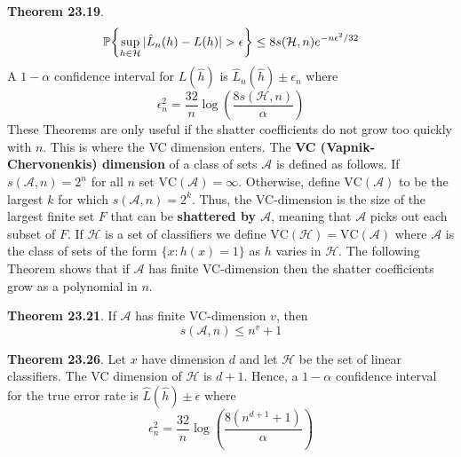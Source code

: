 \textbf{Theorem 23.19}.
\[
\PROB \left\{ \sup_{h \in \mathcal{H}} | \hat{L}_{n}(h) - L(h) | > \epsilon \right\} \leq 8 s(\mathcal{H}, n) e^{-n \epsilon^{2} / 32}
\]
A \(1 - \alpha\) confidence interval for \(L(\hat{h})\) is
\(\hat{L}_{n}(\hat{h}) \pm \epsilon_{n}\) where
\[
\epsilon_{n}^{2} = \frac{32}{n} \log \left( \frac{8 s(\mathcal{H}, n)}{\alpha} \right)
\]
These Theorems are only useful if the shatter coefficients do not grow
too quickly with \(n\). This is where the VC dimension enters.
The \textbf{VC (Vapnik-Chervonenkis) dimension} of a class of sets
\(\mathcal{A}\) is defined as follows. If \(s(\mathcal{A}, n) = 2^{n}\)
for all \(n\) set \(\text{VC}(\mathcal{A}) = \infty\). Otherwise, define
\(\text{VC}(\mathcal{A})\) to be the largest \(k\) for which
\(s(\mathcal{A}, n) = 2^{k}\).
Thus, the VC-dimension is the size of the largest finite set \(F\) that
can be \textbf{shattered by \(\mathcal{A}\)}, meaning that
\(\mathcal{A}\) picks out each subset of \(F\). If \(\mathcal{H}\) is a
set of classifiers we define
\(\text{VC}(\mathcal{H}) = \text{VC}(\mathcal{A})\) where
\(\mathcal{A}\) is the class of sets of the form \(\{ x : h(x) = 1 \}\)
as \(h\) varies in \(\mathcal{H}\). The following Theorem shows that if
\(\mathcal{A}\) has finite VC-dimension then the shatter coefficients
grow as a polynomial in \(n\).

\textbf{Theorem 23.21}. If \(\mathcal{A}\) has finite VC-dimension
\(v\), then
\[
s(\mathcal{A}, n) \leq n^v + 1
\]

\textbf{Theorem 23.26}. Let \(x\) have dimension \(d\) and let
\(\mathcal{H}\) be the set of linear classifiers. The VC dimension of
\(\mathcal{H}\) is \(d + 1\). Hence, a \(1 - \alpha\) confidence
interval for the true error rate is \(\hat{L}(\hat{h}) \pm \epsilon\)
where
\[
\epsilon_{n}^{2} = \frac{32}{n} \log \left( \frac{8 (n^{d + 1} + 1)}{\alpha} \right)
\]

